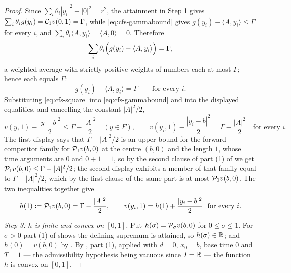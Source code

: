 \begin{proof}
Since $\sum_i\theta_i|y_i|^2-|0|^2=r^2$, the
attainment in Step 1 gives $\sum_i\theta_ig(y_i)=\mathcal{C}_1v(0,1)=\Gamma$, while
\eqref{eq:cfs-gammabound} gives $g(y_i)-\langle A,y_i\rangle\le\Gamma$ for every
$i$, and
$\sum_i\theta_i\langle A,y_i\rangle=\langle A,0\rangle=0$. Therefore
\[
  \sum_i\theta_i\Bigl(g(y_i)-\langle A,y_i\rangle\Bigr)=\Gamma,
\]
a weighted average with strictly positive weights of numbers each at most
$\Gamma$; hence each equals $\Gamma$:
\[
  g(y_i)-\langle A,y_i\rangle=\Gamma\qquad\text{for every }i .
\]
Substituting \eqref{eq:cfs-square} into \eqref{eq:cfs-gammabound} and into the
displayed equalities, and cancelling the constant $|A|^2/2$,
\[
  v(y,1)-\frac{|y-b|^2}{2}\le\Gamma-\frac{|A|^2}{2}\quad(y\in F),
  \qquad
  v(y_i,1)-\frac{|y_i-b|^2}{2}=\Gamma-\frac{|A|^2}{2}\quad\text{for every }i .
\]
The first display says that $\Gamma-|A|^2/2$ is an upper bound for the forward
competitor family for $\mathcal{P}_1v(b,0)$ at the centre $(b,0)$ and the length $1$,
whose time arguments are $0$ and $0+1=1$, so by the second clause of part (1) of
 we get $\mathcal{P}_1v(b,0)\le\Gamma-|A|^2/2$;
the second display exhibits a member of that family equal to $\Gamma-|A|^2/2$,
which by the first clause of the same part is at most $\mathcal{P}_1v(b,0)$. The two
inequalities together give
\begin{equation}\label{eq:cfs-h1}
  h(1):=\mathcal{P}_1v(b,0)=\Gamma-\frac{|A|^2}{2},
  \qquad
  v(y_i,1)=h(1)+\frac{|y_i-b|^2}{2}\ \ \text{for every }i .
\end{equation}

\emph{Step 3: $h$ is finite and convex on $[0,1]$.}
Put $h(\sigma)=\mathcal{P}_\sigma v(b,0)$ for $0\le\sigma\le1$. For $\sigma>0$ part (1)
of  shows the defining supremum is attained, so
$h(\sigma)\in\mathbb{R}$; and $h(0)=v(b,0)$ by . By
, part (1), applied with $d=0$, $x_0=b$, base time
$0$ and $T=1$ — the admissibility hypothesis being vacuous since $I=\mathbb{R}$ — the
function $h$ is convex on $[0,1]$.


\end{proof}
